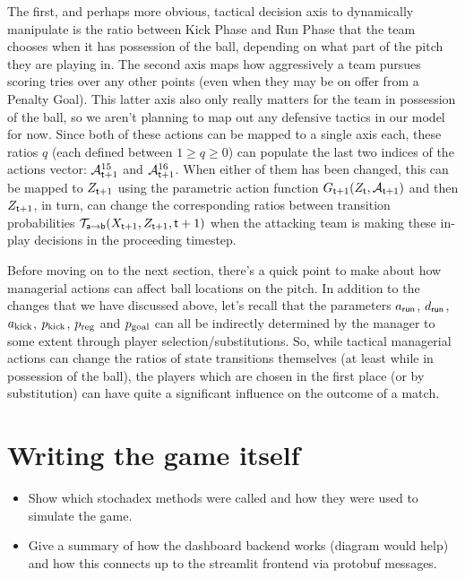 The first, and perhaps more obvious, tactical decision axis to dynamically manipulate is the ratio between {\sf Kick Phase} and {\sf Run Phase} that the team chooses when it has possession of the ball, depending on what part of the pitch they are playing in. The second axis maps how aggressively a team pursues scoring tries over any other points (even when they may be on offer from a {\sf Penalty Goal}). This latter axis also only really matters for the team in possession of the ball, so we aren't planning to map out any defensive tactics in our model for now. Since both of these actions can be mapped to a single axis each, these ratios $q$ (each defined between $1\geq q \geq 0$) can populate the last two indices of the actions vector: ${\cal A}^{15}_{{\sf t}+1}$ and ${\cal A}^{16}_{{\sf t}+1}$. When either of them has been changed, this can be mapped to $Z_{{\sf t}+1}$ using the parametric action function $G_{{\sf t}+1}(Z_{\sf t},{\cal A}_{{\sf t}+1})$ and then $Z_{{\sf t}+1}$, in turn, can change the corresponding ratios between transition probabilities ${\cal T}_{{\sf a}\rightarrow {\sf b}}(X_{{\sf t}+1},Z_{{\sf t}+1},{\sf t}+1)$ when the attacking team is making these in-play decisions in the proceeding timestep.

Before moving on to the next section, there's a quick point to make about how managerial actions can affect ball locations on the pitch. In addition to the changes that we have discussed above, let's recall that the parameters $a_{\sf run}$, $d_{\sf run}$, $a_{\rm kick}$, $p_{\rm kick}$, $p_{\rm reg}$ and $p_{\rm goal}$ can all be indirectly determined by the manager to some extent through player selection/substitutions. So, while tactical managerial actions can change the ratios of state transitions themselves (at least while in possession of the ball), the players which are chosen in the first place (or by substitution) can have quite a significant influence on the outcome of a match.

\section{\sffamily Writing the game itself}

\begin{itemize}
\item{Show which stochadex methods were called and how they were used to simulate the game.}
\item{Give a summary of how the dashboard backend works (diagram would help) and how this connects up to the streamlit frontend via protobuf messages.}
\end{itemize}